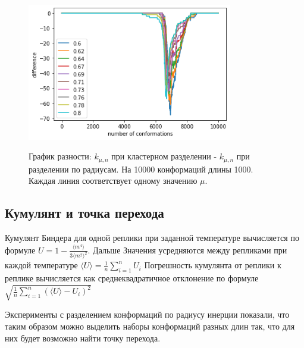 \begin{figure}[h]
	\centering
	\includegraphics[width=0.8\textwidth]{../images/radius_and_cluster_comparising_L1000.png}
	\label{fig:kmun_dif}
	\caption{График разности: $k_{\mu, n}$ при кластерном разделении - $k_{\mu, n}$ при разделении по радиусам. На 10000 конформаций длины 1000. Каждая линия соответствует одному значению $\mu$.}
\end{figure}





\subsection{Кумулянт и точка перехода}

Кумулянт Биндера для одной реплики при заданной температуре вычисляется по формуле $U = 1 - \frac{\langle m^4\rangle}{3\langle m^2\rangle ^2}$. Дальше Значения усредняются между репликами при каждой температуре $\langle U\rangle = \frac{1}{n}\sum_{i=1}^{n}U_i$ 
Погрешность кумулянта от реплики к реплике вычисляется как среднеквадратичное отклонение по формуле $\sqrt{\frac{1}{n}\sum_{i=1}^{n}(\langle U\rangle - U_i)^2}$


Эксперименты с разделением конформаций по радиусу инерции показали, что таким образом можно выделить наборы конформаций разных длин так, что для них будет возможно найти точку перехода.

